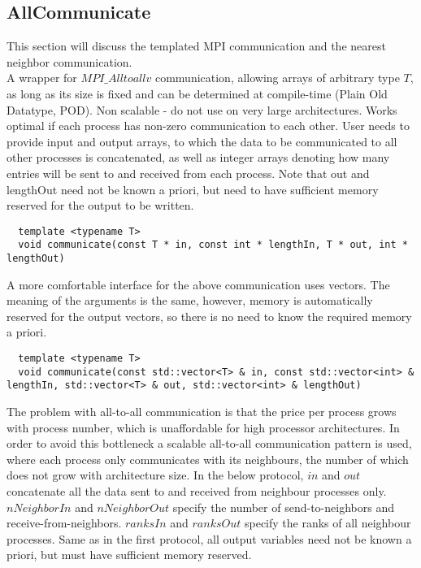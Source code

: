 \subsection{AllCommunicate}
\label{interface-allcommunicate}

This section will discuss the templated MPI communication and the nearest neighbor communication. \\

\noindent
A wrapper for $MPI\_Alltoallv$ communication, allowing arrays of arbitrary type $T$, as long as its size is fixed and can be determined at compile-time (Plain Old Datatype, POD). Non scalable - do not use on very large architectures. Works optimal if each process has non-zero communication to each other. User needs to provide input and output arrays, to which the data to be communicated to all other processes is concatenated, as well as integer arrays denoting how many entries will be sent to and received from each process. Note that out and lengthOut need not be known a priori, but need to have sufficient memory reserved for the output to be written.
\begin{mybox}
\begin{lstlisting}
  template <typename T>
  void communicate(const T * in, const int * lengthIn, T * out, int * lengthOut)
\end{lstlisting}
\end{mybox}
\noindent
A more comfortable interface for the above communication uses vectors. The meaning of the arguments is the same, however, memory is automatically reserved for the output vectors, so there is no need to know the required memory a priori.
\begin{mybox}
\begin{lstlisting}
  template <typename T>
  void communicate(const std::vector<T> & in, const std::vector<int> & lengthIn, std::vector<T> & out, std::vector<int> & lengthOut)
\end{lstlisting}
\end{mybox}
\noindent
The problem with all-to-all communication is that the price per process grows with process number, which is unaffordable for high processor architectures. In order to avoid this bottleneck a scalable all-to-all communication pattern is used, where each process only communicates with its neighbours, the number of which does not grow with architecture size. In the below protocol, $in$ and $out$ concatenate all the data sent to and received from neighbour processes only. $nNeighborIn$ and $nNeighborOut$ specify the number of send-to-neighbors and receive-from-neighbors. $ranksIn$ and $ranksOut$ specify the ranks of all neighbour processes. Same as in the first protocol, all output variables need not be known a priori, but must have sufficient memory reserved.
